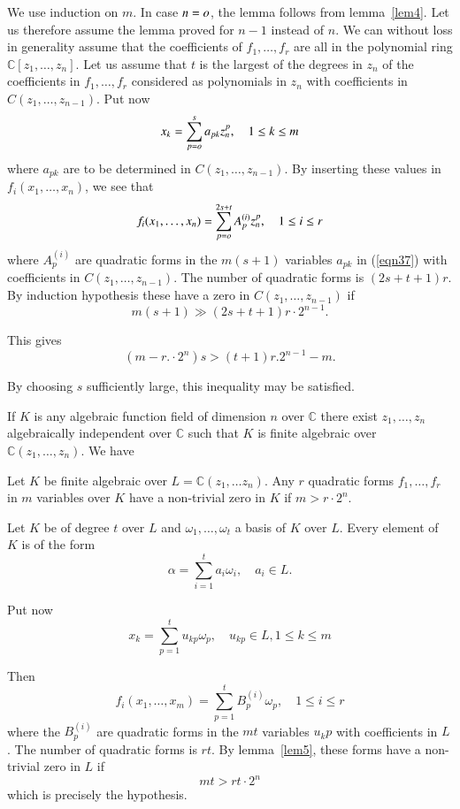 \begin{Proof}
We use induction on $m$. In case $n=o$, the lemma follows from lemma~\ref{lem4}. Let us therefore assume the lemma proved for $n-1$ instead
of $n$. We can without loss in generality assume that the coefficients
of $f_1,\ldots,f_r$ are all in the polynomial ring
$\mathbb{C}[z_1,\ldots,z_n]$. Let us assume that $t$ is the largest of
the degrees in
$z_n$ of the coefficients in $f_1,\ldots,f_r$ considered as
polynomials in $z_n$ with coefficients in $C(z_1,\ldots,z_{n-1})$. Put
now 
\begin{equation}\label{eqn37}
x_k=\sum\limits_{p=o}^{s}a_{pk} z^{p}_n,\quad 1\leq k \leq m
\end{equation}
where $a_{pk}$ are to be determined in $C(z_1,\ldots,z_{n-1})$. By
inserting these values in $f_i(x_1,\ldots,x_n)$, we see that 
$$
f_i(x_1,\ldots,x_n)=\sum\limits_{p=o}^{2s+t}A_p^{(i)} z^{p}_n,\quad
1\leq i\leq r
$$
where $A^{(i)}_p$ are quadratic forms in the $m(s+1)$ variables
$a_{pk}$ in (\ref{eqn37}) with coefficients in
$C(z_1,\ldots,z_{n-1})$. The number of quadratic forms is
$(2s+t+1)r$. By induction hypothesis these have a zero in
$C(z_1,\ldots,z_{n-1})$ if 
$$
m(s+1)\gg(2s+t+1)r\cdot 2^{n-1}.
$$

This gives
$$
(m-r.\cdot 2^{n})s>(t+1)r.2^{n-1}-m.
$$

By choosing $s$ sufficiently large, this inequality may be satisfied. 

If $K$ is any algebraic function field of dimension $n$ over
$\mathbb{C}$ there exist $z_1,\ldots,z_n$ algebraically independent
over $\mathbb{C}$ such that $K$ is finite algebraic over
$\mathbb{C}(z_1,\ldots,z_n)$. We have 
\enprf
\end{Proof}

\begin{lem}\label{lem6}
Let $K$ be finite algebraic over $L=\mathbb{C}(z_1,\ldots z_n)$. Any
$r$ quadratic forms $f_1,\ldots,f_r$ in $m$ variables over $K$ have a
non-trivial zero in $K$ if $m>r\cdot 2^{n}$.
\end{lem}

\begin{Proof}
Let $K$ be of degree $t$ over $L$ and $\omega_1,\ldots,\omega_t$ a
basis of $K$ over $L$. Every element of $K$ is of the form 
$$
\alpha=\sum\limits_{i=1}^{t}a_i\omega_i,\quad a_i\in L.
$$

Put now
$$
x_k=\sum\limits_{p=1}^{t}u_{kp}\omega_p,\quad u_{kp}\in L, 1\leq k\leq m
$$

Then
$$
f_i(x_1,\ldots,x_m)=\sum\limits_{p=1}^{t}B_p^{(i)}\omega_p,\quad 1\leq
i\leq r
$$
where the $B^{(i)}_p$ are quadratic forms in the $mt$ variables
$u_{k}p$ with coefficients in $L$. The number of quadratic forms is
$rt$. By lemma~\ref{lem5}, these forms have a non-trivial zero in $L$
if 
$$
mt > rt\cdot 2^{n}
$$
which is precisely the hypothesis.
\enprf
\end{Proof}


